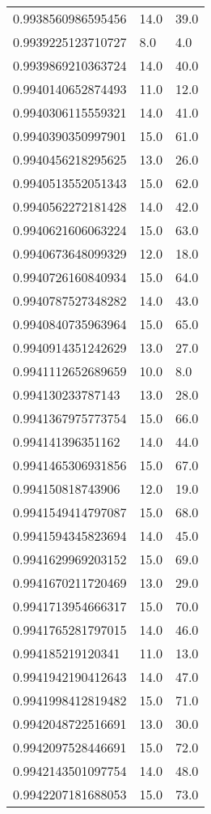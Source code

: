 \begin{center}
\begin{supertabular}[H]{p{0.30\textwidth}p{0.05\textwidth}p{0.05\textwidth}}
0.9938560986595456 & 14.0 & 39.0 \\ 
0.9939225123710727 & 8.0 & 4.0 \\ 
0.9939869210363724 & 14.0 & 40.0 \\ 
0.9940140652874493 & 11.0 & 12.0 \\ 
0.9940306115559321 & 14.0 & 41.0 \\ 
0.9940390350997901 & 15.0 & 61.0 \\ 
0.9940456218295625 & 13.0 & 26.0 \\ 
0.9940513552051343 & 15.0 & 62.0 \\ 
0.9940562272181428 & 14.0 & 42.0 \\ 
0.9940621606063224 & 15.0 & 63.0 \\ 
0.9940673648099329 & 12.0 & 18.0 \\ 
0.9940726160840934 & 15.0 & 64.0 \\ 
0.9940787527348282 & 14.0 & 43.0 \\ 
0.9940840735963964 & 15.0 & 65.0 \\ 
0.9940914351242629 & 13.0 & 27.0 \\ 
0.9941112652689659 & 10.0 & 8.0 \\ 
0.994130233787143 & 13.0 & 28.0 \\ 
0.9941367975773754 & 15.0 & 66.0 \\ 
0.994141396351162 & 14.0 & 44.0 \\ 
0.9941465306931856 & 15.0 & 67.0 \\ 
0.994150818743906 & 12.0 & 19.0 \\ 
0.9941549414797087 & 15.0 & 68.0 \\ 
0.9941594345823694 & 14.0 & 45.0 \\ 
0.9941629969203152 & 15.0 & 69.0 \\ 
0.9941670211720469 & 13.0 & 29.0 \\ 
0.9941713954666317 & 15.0 & 70.0 \\ 
0.9941765281797015 & 14.0 & 46.0 \\ 
0.994185219120341 & 11.0 & 13.0 \\ 
0.9941942190412643 & 14.0 & 47.0 \\ 
0.9941998412819482 & 15.0 & 71.0 \\ 
0.9942048722516691 & 13.0 & 30.0 \\ 
0.9942097528446691 & 15.0 & 72.0 \\ 
0.9942143501097754 & 14.0 & 48.0 \\ 
0.9942207181688053 & 15.0 & 73.0 \\ 

\end{supertabular}
\end{center}
